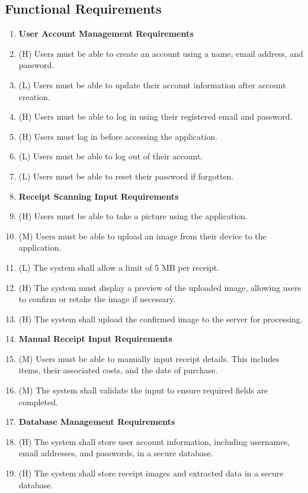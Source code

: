 \documentclass[12pt]{article}
\begin{document}
\subsection{Functional Requirements}
\begin{enumerate}[label=FR\arabic*]
  \item[] \textbf{User Account Management Requirements}
  \item (H) Users must be able to create an account using a name, email
  address, and password.
  \item (L) Users must be able to update their account information after account
  creation.
  \item (H) Users must be able to log in using their registered email and password.
  \item (H) Users must log in before accessing the application.
  \item (L) Users must be able to log out of their account.
  \item (L) Users must be able to reset their password if forgotten.

  \item[] \textbf{Receipt Scanning Input Requirements}
  \item (H) Users must be able to take a picture using the application.
  \item (M) Users must be able to upload an image from their device to the
  application.
  \item (L) The system shall allow a limit of 5 MB per receipt.
  \item (H) The system must display a preview of the uploaded image, allowing users
  to confirm or retake the image if necessary. 
  \item (H) The system shall upload the confirmed image to the server for processing.
  
  \item[] \textbf{Manual Receipt Input Requirements}
  \item (M) Users must be able to manually input receipt details. This includes
  items, their associated costs, and the date of purchase.
  \item (M) The system shall validate the input to ensure required fields are
  completed.
  
  \item[] \textbf{Database Management Requirements}
  \item (H) The system shall store user account information, including usernames,
  email addresses, and passwords, in a secure database.
  \item (H) The system shall store receipt images and extracted data in a secure database.


\end{enumerate}
\end{document}
